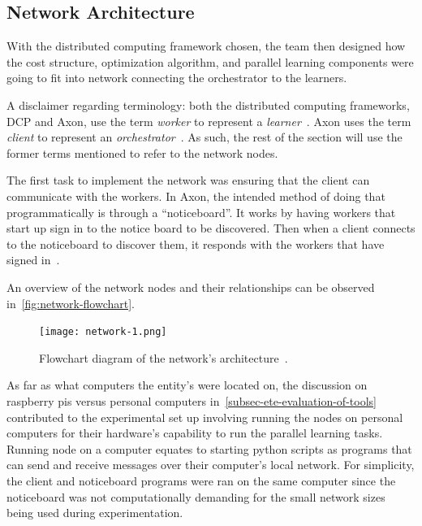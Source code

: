 \documentclass[../mthe-493-final-project.tex]{subfiles}
\begin{document}
    \subsection{Network Architecture}
    \label{ssec:network-architecture}

    With the distributed computing framework chosen, the team then designed how the cost structure, optimization algorithm, and parallel learning components were going to fit into network connecting the orchestrator to the learners.

    A disclaimer regarding terminology: both the distributed computing frameworks, DCP and Axon, use the term \textit{worker} to represent a \textit{learner}~\cite{Mays_Axon}\cite{noauthor_worker_nodate}. Axon uses the term \textit{client} to represent an \textit{orchestrator}~\cite{Mays_Axon}. As such, the rest of the section will use the former terms mentioned to refer to the network nodes.

    The first task to implement the network was ensuring that the client can communicate with the workers. In Axon, the intended method of doing that programmatically is through a ``noticeboard''. It works by having workers that start up sign in to the notice board to be discovered. Then when a client connects to the noticeboard to discover them, it responds with the workers that have signed in~\cite{Mays_Axon}.

    An overview of the network nodes and their relationships can be observed in~\autoref{fig:network-flowchart}.
    
    \begin{figure}
        \texttt{[image: network-1.png]}
        \caption{Flowchart diagram of the network's architecture~\cite{group_a2_Optimization_Of_Data}.}
        \label{fig:network-flowchart}
    \end{figure}

    As far as what computers the entity's were located on, the discussion on raspberry pis versus personal computers in~\autoref{subsec-ete-evaluation-of-tools} contributed to the experimental set up involving running the nodes on personal computers for their hardware's capability to run the parallel learning tasks. Running node on a computer equates to starting python scripts as programs that can send and receive messages over their computer's local network. For simplicity, the client and noticeboard programs were ran on the same computer since the noticeboard was not computationally demanding for the small network sizes being used during experimentation.
\end{document}
